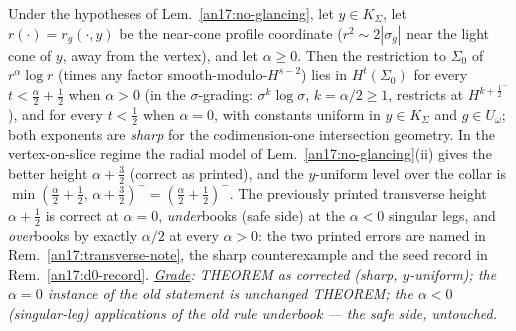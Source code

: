 \begin{lemma}[Transverse restriction of cone profiles to a spacelike slice;
honest sharp height $\tfrac\alpha2+\tfrac12$ at $\alpha>0$ (the transverse correction;
the printed height $\alpha+\tfrac12$ stands only at $\alpha=0$)]
\label{an17:transverse-data}
Under the hypotheses of Lem.~\ref{an17:no-glancing}, let $y\in K_\Sigma$, let
$r(\cdot)=r_g(\cdot,y)$ be the near-cone profile coordinate
($r^2\sim2|\sigma_g|$ near the light cone of $y$, away from the vertex), and
let $\alpha\ge0$. Then the restriction to $\Sigma_0$ of $r^\alpha\log r$ (times
any factor smooth-modulo-$H^{s-2}$) lies in $H^{t}(\Sigma_0)$ for every
$t<\tfrac\alpha2+\tfrac12$ when $\alpha>0$ (in the $\sigma$-grading:
$\sigma^k\log\sigma$, $k=\alpha/2\ge1$, restricts at $H^{k+\frac12^-}$), and
for every $t<\tfrac12$ when $\alpha=0$, with constants uniform in
$y\in K_\Sigma$ and $g\in U_\omega$; both exponents are \emph{sharp} for the
codimension-one intersection geometry. In the vertex-on-slice regime the
radial model of Lem.~\ref{an17:no-glancing}(ii) gives the better height
$\alpha+\tfrac32$ (correct as printed), and the $y$-uniform level over the
collar is $\min(\tfrac\alpha2+\tfrac12,\,\alpha+\tfrac32)^-
=(\tfrac\alpha2+\tfrac12)^-$. The previously printed transverse height
$\alpha+\tfrac12$ is correct at $\alpha=0$, \emph{under}books (safe side) at
the $\alpha<0$ singular legs, and \emph{over}books by exactly $\alpha/2$ at
every $\alpha>0$: the two printed errors are named in
Rem.~\ref{an17:transverse-note}, the sharp counterexample and the seed
record in Rem.~\ref{an17:d0-record}. \emph{\underline{Grade}: THEOREM as
corrected (sharp, $y$-uniform); the $\alpha=0$ instance of the old statement is
unchanged THEOREM; the $\alpha<0$ (singular-leg) applications of the old rule
\emph{under}book --- the safe side, untouched.}
\end{lemma}
